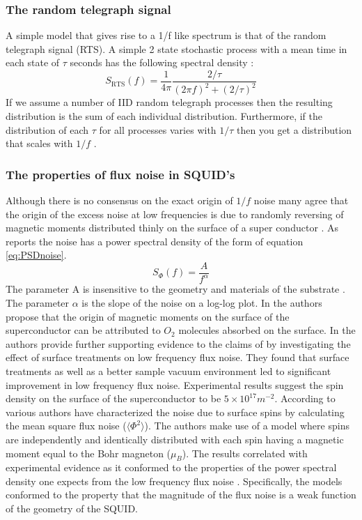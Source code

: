\subsubsection*{The random telegraph signal}
A simple model that gives rise to a 1/f like spectrum is that of the random telegraph signal (RTS). A simple 2 state stochastic process with a mean time in each state of $\tau $ seconds has the following spectral density \cite{fluxNoiseSquidsStevenAnton}: 
\begin{equation}
    S_{\text{RTS}}(f) = \frac{1}{4\pi}\frac{2/\tau}{(2\pi f)^2+(2/\tau)^2}
    \label{eq:RTSPSD}
\end{equation}
If we assume a number of IID random telegraph processes then the resulting distribution is the sum of each individual distribution. Furthermore, if the distribution of each $\tau$ for all processes varies with $1/\tau$ then you get a distribution that scales with $1/f$ \cite{fluxNoiseSquidsStevenAnton}. 
\subsubsection*{The properties of flux noise in SQUID's}
Although there is no consensus on the exact origin of $1/f$ noise many agree that the origin of the excess noise at low frequencies is due to randomly reversing of magnetic moments distributed thinly on the surface of a super conductor \cite{FluxNoiseCol}. As \cite{FluxNoiseCol} reports the noise has a power spectral density of the form of equation \ref{eq:PSDnoise}.
\begin{equation}
    S_\Phi(f) = \frac{A}{f^\alpha}
    \label{eq:PSDnoise}
\end{equation}
The parameter A is insensitive to the geometry and materials of the substrate \cite{fluxNoiseSquidsStevenAnton}. The parameter $\alpha$ is the slope of the noise on a log-log plot. In \cite{SurfaceSpinOrig} the authors propose that the origin of magnetic moments on the surface of the superconductor can be attributed to $O_2$ molecules absorbed on the surface. In \cite{OriginAndReductionOf1/fNoise} the authors provide further supporting evidence to the claims of \cite{SurfaceSpinOrig} by investigating the effect of surface treatments on low frequency flux noise. They found that surface treatments as well as a better sample vacuum environment led to significant improvement in low frequency flux noise. Experimental results suggest the spin density on the surface of the superconductor to be $5\times10^{17}m^{-2}$. According to \cite{fluxNoiseSquidsStevenAnton} various authors have characterized the noise due to surface spins by calculating the mean square flux noise ($\langle \Phi^2\rangle $). The authors make use of a model where spins are independently and identically distributed with each spin having a magnetic moment equal to the Bohr magneton ($\mu_B$). The results correlated with experimental evidence as it conformed to the properties of the power spectral density one expects from the low frequency flux noise \cite{fluxNoiseSquidsStevenAnton}. Specifically, the models conformed to the property that the magnitude of the flux noise is a weak function of the geometry of the SQUID.

